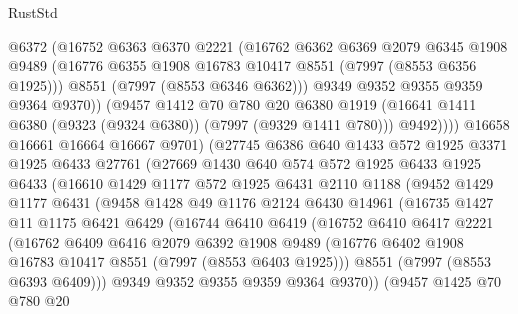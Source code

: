 \begin{lexlean}{RustStd}
\begin{coremodule}
{\begin{coremodule}
{{{{{{{{{{{{{{{{{{{{{{{{{{{{{{{{{{{{{{{{{{{                @6372
                (@16752
                  @6363
                  @6370
                  @2221
                  (@16762
                    @6362
                    @6369
                    @2079
                    @6345
                    @1908
                    @9489
                    (@16776 @6355 @1908 @16783 @10417 @8551 (@7997 (@8553 @6356 @1925)))
                    @8551
                    (@7997 (@8553 @6346 @6362)))
                  @9349
                  @9352
                  @9355
                  @9359
                  @9364
                  @9370))
              (@9457
                @1412
                @70
                @780
                @20
                @6380
                @1919
                (@16641 @1411 @6380 (@9323 (@9324 @6380)) (@7997 (@9329 @1411 @780)))
                @9492))))
        @16658
        @16661
        @16664
        @16667
        @9701)
      (@27745
        @6386
        @640
        @1433
        @572
        @1925
        @3371
        @1925
        @6433
        @27761
        (@27669
          @1430
          @640
          @574
          @572
          @1925
          @6433
          @1925
          @6433
          (@16610
            @1429
            @1177
            @572
            @1925
            @6431
            @2110
            @1188
            (@9452
              @1429
              @1177
              @6431
              (@9458
                @1428
                @49
                @1176
                @2124
                @6430
                @14961
                (@16735
                  @1427
                  @11
                  @1175
                  @6421
                  @6429
                  (@16744
                    @6410
                    @6419
                    (@16752
                      @6410
                      @6417
                      @2221
                      (@16762
                        @6409
                        @6416
                        @2079
                        @6392
                        @1908
                        @9489
                        (@16776 @6402 @1908 @16783 @10417 @8551 (@7997 (@8553 @6403 @1925)))
                        @8551
                        (@7997 (@8553 @6393 @6409)))
                      @9349
                      @9352
                      @9355
                      @9359
                      @9364
                      @9370))
                  (@9457
                    @1425
                    @70
                    @780
                    @20
}}}}}}}}}}}}}}}}}}}}}}}}}}}}}}}}}}}}}}}}}}}
\end{coremodule}}
\end{coremodule}
\end{lexlean}
